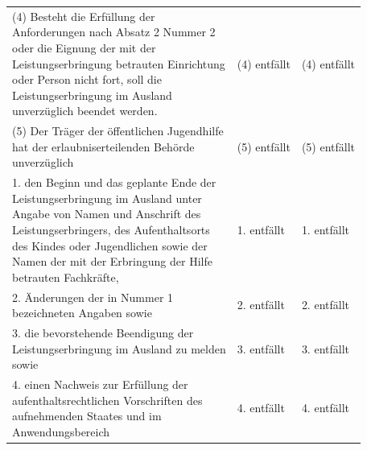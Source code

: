 \documentclass[10pt,a4paper,landscape]{article}
\begin{document}
\begin{longtable}{|L{8.2cm}|L{8.2cm}|L{8.2cm}|}
\hhline{|---|}
(4) \textcolor{diffred}{Besteht die Erfüllung der  \newline Anforderungen nach Absatz 2 Nummer 2  \newline oder die Eignung der mit der  \newline Leistungserbringung betrauten Einrichtung  \newline oder Person nicht fort, soll die  \newline Leistungserbringung im Ausland  \newline unverzüglich beendet werden.} & (4) entfällt & (4) entfällt \\
\hhline{|---|}
(5) \textcolor{diffred}{Der Träger der öffentlichen Jugendhilfe  \newline hat der erlaubniserteilenden Behörde  \newline unverzüglich} & (5) entfällt & (5) entfällt \\
\hhline{|---|}
1.   \newline \textcolor{diffred}{den Beginn und das geplante Ende der  \newline Leistungserbringung im Ausland unter  \newline Angabe von Namen und Anschrift des  \newline Leistungserbringers, des Aufenthaltsorts  \newline des Kindes oder Jugendlichen sowie der  \newline Namen der mit der Erbringung der Hilfe  \newline betrauten Fachkräfte,} & 1. entfällt & 1. entfällt \\
\hhline{|---|}
2.   \newline \textcolor{diffred}{Änderungen der in Nummer 1  \newline bezeichneten Angaben sowie} & 2. entfällt & 2. entfällt \\
\hhline{|---|}
3.   \newline \textcolor{diffred}{die bevorstehende Beendigung der  \newline Leistungserbringung im Ausland zu melden  \newline sowie} & 3. entfällt & 3. entfällt \\
\hhline{|---|}
4.   \newline \textcolor{diffred}{einen Nachweis zur Erfüllung der  \newline aufenthaltsrechtlichen Vorschriften des  \newline aufnehmenden Staates und im  \newline Anwendungsbereich} & 4. entfällt & 4. entfällt \\

\end{longtable}
\end{document}
